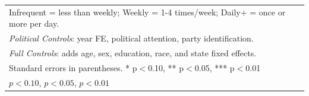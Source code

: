 \begin{table}[htbp]
\begin{tabular}{l*{2}{c}}
\multicolumn{3}{l}{\footnotesize Infrequent = less than weekly; Weekly = 1-4 times/week; Daily+ = once or more per day.}\\
\multicolumn{3}{l}{\footnotesize \textit{Political Controls}: year FE, political attention, party identification.}\\
\multicolumn{3}{l}{\footnotesize \textit{Full Controls}: adds age, sex, education, race, and state fixed effects.}\\
\multicolumn{3}{l}{\footnotesize Standard errors in parentheses. * p$<$0.10, ** p$<$0.05, *** p$<$0.01}\\
\multicolumn{3}{l}{\footnotesize \sym{*} \(p<0.10\), \sym{**} \(p<0.05\), \sym{***} \(p<0.01\)}\\
\end{tabular}
\end{table}
